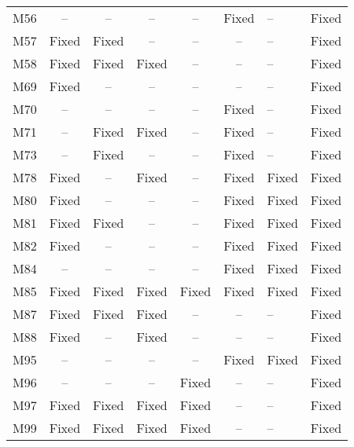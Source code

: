 \begin{table}[!t]
{\begin{tabular}{|c|c|c|c|c|c|}
M56               & --        & --        & --        & --        & Fixed     & --        &Fixed   \\
M57               & Fixed     & Fixed     & --        & --        & --        & --        &Fixed   \\
M58               & Fixed     & Fixed     & Fixed     & --        & --        & --        &Fixed   \\
M69               & Fixed     & --        & --        & --        & --        & --        &Fixed   \\
M70               & --        & --        & --        & --        & Fixed     & --        &Fixed   \\
M71               & --        & Fixed     & Fixed     & --        & Fixed     & --        &Fixed   \\
M73               & --        & Fixed     & --        & --        & Fixed     & --        &Fixed   \\
M78               & Fixed     & --        & Fixed     & --        & Fixed     & Fixed     &Fixed   \\
M80               & Fixed     & --        & --        & --        & Fixed     & Fixed     &Fixed   \\
M81               & Fixed     & Fixed     & --        & --        & Fixed     & Fixed     &Fixed   \\
M82               & Fixed     & --        & --        & --        & Fixed     & Fixed     &Fixed   \\
M84               & --        & --        & --        & --        & Fixed     & Fixed     &Fixed   \\
M85               & Fixed     & Fixed     & Fixed     & Fixed     & Fixed     & Fixed     &Fixed   \\
M87               & Fixed     & Fixed     & Fixed     & --        & --        & --        &Fixed   \\
M88               & Fixed     & --        & Fixed     & --        & --        & --        &Fixed   \\
M95               & --        & --        & --        & --        & Fixed     & Fixed     &Fixed   \\
M96               & --        & --        & --        & Fixed     & --        & --        &Fixed   \\
M97               & Fixed     & Fixed     & Fixed     & Fixed     & --        & --        &Fixed   \\
M99               & Fixed     & Fixed     & Fixed     & Fixed     & --        & --        &Fixed   \\

\end{tabular}}
\end{table}
